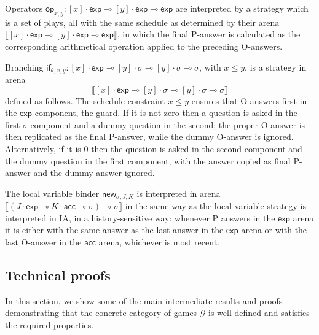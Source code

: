 \documentclass{article}
\newcommand{\lexpt}{\mathsf{exp}}
\newcommand{\lacct}{\mathsf{acc}}
\newcommand{\lopc}{\mathsf{op}}
\newcommand{\lifc}{\mathsf{if}}
\newcommand{\lnewc}{\mathsf{new}}
\newcommand{\sbr}[1]{\llbracket {#1}\rrbracket}
\begin{document}
Operators $\lopc_{x,y}:[x]\cdot\lexpt \multimap[y]\cdot\lexpt\multimap\lexpt$ are interpreted by a strategy which is a set of plays, all with the same schedule as determined by their arena $\sbr{[x]\cdot\lexpt \multimap[y]\cdot\lexpt\multimap\lexpt}$, in which the final P-answer is calculated as the corresponding arithmetical operation applied to the preceding O-answers. 

Branching $\lifc_{\theta,x,y}:[x]\cdot\lexpt\multimap[y]\cdot\sigma\multimap[y]\cdot\sigma\multimap \sigma$, with $x\leq y$, is a strategy in arena
\[
\sbr{[x]\cdot\lexpt\multimap[y]\cdot\sigma\multimap[y]\cdot\sigma\multimap \sigma}
\]
defined as follows. The schedule constraint $x\leq y$ ensures that O answers first in the $\lexpt$ component, the guard. If it is not zero then a question is asked in the first $\sigma$ component and a dummy question in the second; the proper O-answer is then replicated as the final P-answer, while the dummy O-answer is ignored. Alternatively, if it is 0 then the question is asked in the second component and the dummy question in the first component, with the answer copied as final P-answer and the dummy answer ignored. 

The local variable binder $\lnewc_{\sigma,J,K}$ is interpreted in arena $\sbr{(J\cdot \lexpt\multimap K\cdot\lacct\multimap\sigma)\multimap\sigma}$ in the same way as the local-variable strategy is interpreted in IA, in a history-sensitive way: whenever P answers in the $\lexpt$ arena it is either with the same answer as the last answer in the $\lexpt$ arena or with the last O-answer in the $\lacct$ arena, whichever is most recent.  

\subsection{Technical proofs}\label{sec:tec}

In this section, we show some of the main intermediate results and proofs demonstrating that the concrete category of games $\mathcal G$ is well defined and satisfies the required properties. 
\end{document}

